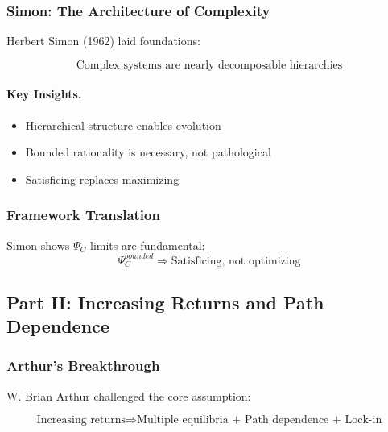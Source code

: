 \subsubsection{Simon: The Architecture of Complexity}

Herbert Simon (1962) laid foundations:

\begin{equation}
\boxed{
\text{Complex systems are nearly decomposable hierarchies}
}
\label{eq:simon-hierarchy}
\end{equation}

\paragraph{Key Insights.}
\begin{itemize}
    \item Hierarchical structure enables evolution
    \item Bounded rationality is necessary, not pathological
    \item Satisficing replaces maximizing
\end{itemize}

\subsubsection{Framework Translation}

Simon shows $\Psi_C$ limits are fundamental:
\begin{equation}
\Psi_C^{bounded} \Rightarrow \text{Satisficing, not optimizing}
\end{equation}

\subsection{Part II: Increasing Returns and Path Dependence}

\subsubsection{Arthur's Breakthrough}

W. Brian Arthur challenged the core assumption:

\begin{equation}
\boxed{
\text{Increasing returns} \Rightarrow \text{Multiple equilibria + Path dependence + Lock-in}
}
\label{eq:arthur-ir}
\end{equation}

